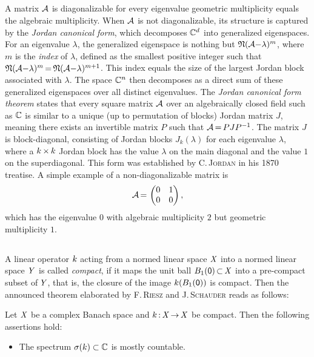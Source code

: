 \documentclass[11pt,twoside]{article}
\begin{document}
\begin{itemize}[leftmargin=12pt]
\subparagraph{} %
A matrix ${\mathcal{A}}$ is diagonalizable \iff
for every eigenvalue geometric multiplicity equals the algebraic multiplicity.
When ${\mathcal{A}}$ is not diagonalizable,
its structure is captured by the \textit{Jordan canonical form},
which decomposes ${\mathbb{C}}^d$ into generalized eigenspaces.
For an eigenvalue $\lambda$,
the generalized eigenspace is nothing but $\mathfrak{N}({\mathcal{A}}{-}\lambda)^m$,
where $m$ is the \textit{index} of $\lambda$,
defined as the smallest positive integer
such that $\mathfrak{N}({\mathcal{A}}{-}\lambda)^m {\,=\,} \mathfrak{N}({\mathcal{A}}{-}\lambda)^{m+1}$.
This index equals the size of the largest Jordan block
associated with $\lambda$.
The space ${\mathbb{C}}^n$ then decomposes as a direct sum
of these generalized eigenspaces over all distinct eigenvalues.
The \textit{Jordan canonical form theorem} states that
every square matrix ${\mathcal{A}}$ over an algebraically closed field such as ${\mathbb{C}}$
is similar to a unique (up to permutation of blocks) Jordan matrix $J$,
meaning there exists an invertible matrix $P$ such that ${\mathcal{A}} {\,=\,} PJP^{-1}$.
The matrix $J$ is block-diagonal,
consisting of Jordan blocks $J_k(\lambda)$ for each eigenvalue $\lambda$,
where a $k {\,\times\,} k$ Jordan block has the value $\lambda$ on the main diagonal
and the value $1$ on the superdiagonal.
This form was established by \textsc{C.\,Jordan} in his 1870 treatise.
A simple example of a non-diagonalizable matrix is
\[
{\mathcal{A}} {\,=\,} \begin{pmatrix} 0 & 1 \\ 0 & 0 \end{pmatrix},
\]
which has the eigenvalue $0$ with algebraic multiplicity $2$
but geometric multiplicity $1$.

\subsection{} %
A linear operator $k$ acting from a normed linear space $\mathit{X}$
into a normed linear space $\mathit{Y}$ is called \textit{compact},
if it maps the unit ball $B_1({\mathsf{0}}) {\,\subset\,} \mathit{X}$
into a pre-compact subset of\,$\mathit{Y}$,
that is,
the closure of the image $k(B_1({\mathsf{0}}))$ is compact.
Then the announced theorem
elaborated by \textsc{F.\,Riesz} and \textsc{J.\,Schauder}
reads as follows:

\begin{theorem}\label{RIESZ-SCHAUDER_SPECTRAL_THEOREM}
Let $\mathit{X}$ be a complex Banach space
and $k {\,:\,} \mathit{X} {\,\to\,} \mathit{X}$ be compact.
Then the following assertions hold:

\begin{itemize}[leftmargin=15pt]
\item[(a)]
The spectrum $\sigma(k) \subset {\mathbb{C}}$ is mostly countable.


\end{itemize}
\end{theorem}
\end{itemize}
\end{document}
